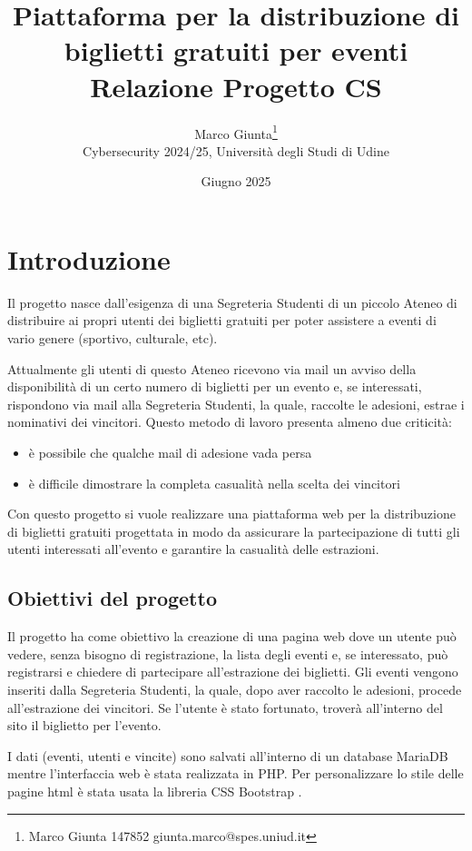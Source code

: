 \documentclass[italian,12pt,a4paper,oneside,final]{report}
\title{\Large Piattaforma per la distribuzione di\\biglietti gratuiti per eventi\\[0.5em]
	\large Relazione Progetto CS}
\date{Giugno 2025}
\author{
	Marco Giunta\thanks{Marco Giunta 147852 giunta.marco@spes.uniud.it}\\
	Cybersecurity 2024/25, Università degli Studi di Udine}
\begin{document}
\maketitle
	
\tableofcontents

\newpage
\section{Introduzione}
Il progetto nasce dall'esigenza di una Segreteria Studenti di un piccolo Ateneo di distribuire ai propri utenti dei biglietti gratuiti per poter assistere a eventi di vario genere (sportivo, culturale, etc).

Attualmente gli utenti di questo Ateneo ricevono via mail un avviso della disponibilità di un certo numero di biglietti per un evento e, se interessati, rispondono via mail alla Segreteria Studenti, la quale, raccolte le adesioni, estrae i nominativi dei vincitori.
Questo metodo di lavoro presenta almeno due criticità:
\begin{itemize}
	\item è possibile che qualche mail di adesione vada persa
	\item è difficile dimostrare la completa casualità nella scelta dei vincitori
\end{itemize}

Con questo progetto si vuole realizzare una piattaforma web per la distribuzione di biglietti gratuiti progettata in modo da assicurare la partecipazione di tutti gli utenti interessati all'evento e garantire la casualità delle estrazioni.

\subsection{Obiettivi del progetto}

Il progetto ha come obiettivo la creazione di una pagina web dove un utente può vedere, senza bisogno di registrazione, la lista degli eventi e, se interessato, può registrarsi e chiedere di partecipare all'estrazione dei biglietti.
Gli eventi vengono inseriti dalla Segreteria Studenti, la quale, dopo aver raccolto le adesioni, procede all'estrazione dei vincitori.
Se l'utente è stato fortunato, troverà all'interno del sito il biglietto per l'evento. 

I dati (eventi, utenti e vincite) sono salvati all'interno di un database MariaDB mentre l'interfaccia web è stata realizzata in PHP.
Per personalizzare lo stile delle pagine html è stata usata la libreria CSS Bootstrap . 
\end{document}
